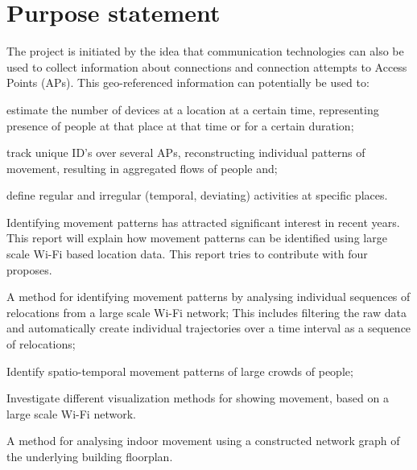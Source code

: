 \section{Purpose statement}\label{purpstate}
The project is initiated by the idea that communication technologies can also be used to collect information about connections and connection attempts to Access Points (APs). This geo-referenced information can potentially be used to: \begin {enumerate*} [label=\itshape\arabic*\upshape),font={\color{red!0!black}\bfseries}] \item estimate the number of devices at a location at a certain time, representing presence of people at that place at that time or for a certain duration; \item track unique ID’s over several APs, reconstructing individual patterns of movement, resulting in
aggregated flows of people and; \item define regular and irregular (temporal, deviating) activities at specific places.
\end{enumerate*}

Identifying movement patterns has attracted significant interest in recent years. This report will explain how movement patterns can be identified using large scale Wi-Fi based location data. This report tries to contribute with four proposes.
\begin {enumerate*} [label=\itshape\arabic*\upshape),font={\color{red!0!black}\bfseries}] \item A method for identifying movement patterns by analysing individual sequences of relocations from a large scale Wi-Fi network; This includes filtering the raw data and automatically create individual trajectories over a time interval as a sequence of relocations; \item Identify spatio-temporal movement patterns of large crowds of people; \item Investigate different visualization methods for showing movement, based on a large scale Wi-Fi network. \item A method for analysing indoor movement using a constructed network graph of the underlying building floorplan.
\end {enumerate*}


